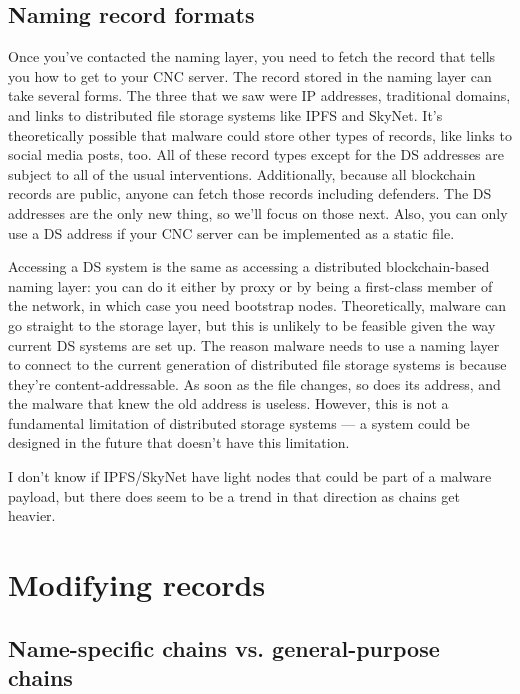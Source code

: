 \documentclass[10pt,sigconf,letterpaper]{acmart}
\begin{document}
\subsection{Naming record formats}

Once you've contacted the naming layer, you need to fetch the record that tells 
you how to get to your CNC server. 
The record stored in the naming layer can take 
several forms. The three that we saw were IP addresses, 
traditional domains, and links to distributed file storage 
systems like IPFS and SkyNet. It's theoretically possible 
that malware could store other types of records, like links 
to social media posts, too. All of these record types except 
for the DS addresses are subject to all of the usual 
interventions. Additionally, because all blockchain records 
are public, anyone can fetch those records including 
defenders. The DS addresses are the only new thing, so we'll 
focus on those next. Also, you can only use a DS address if 
your CNC server can be implemented as a static file.

Accessing a DS system is the same as accessing a distributed 
blockchain-based naming layer: you can do it either by proxy 
or by being a first-class member of the network, in which 
case you need bootstrap nodes. Theoretically, malware can go 
straight to the storage layer, but this is unlikely to be 
feasible given the way current DS systems are set up. The 
reason malware needs 
to use a naming layer to connect to the current generation of 
distributed file storage systems is because they're 
content-addressable. As soon as the file changes, so 
does its address, and the malware that knew the old address 
is useless. 
However, this is not a fundamental limitation of distributed 
storage systems --- a system could be designed in the future 
that doesn't have this limitation.

I don't know if IPFS/SkyNet have light nodes that could be 
part of a malware payload, but there does seem to be a trend 
in that direction as chains get heavier.

\section{Modifying records}

\subsection{Name-specific chains vs. general-purpose chains}
\end{document}
